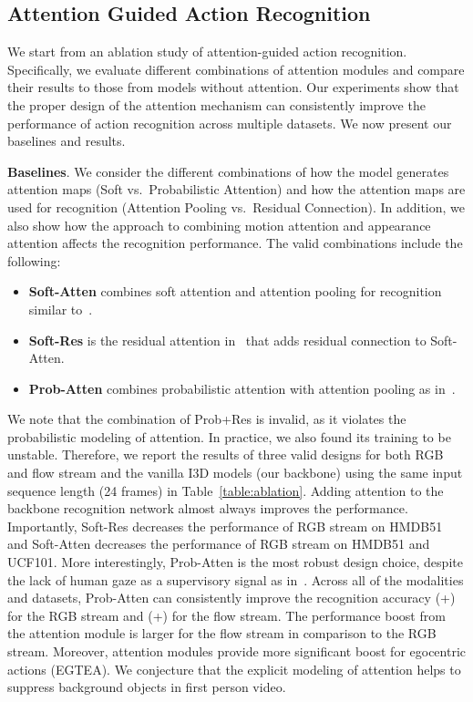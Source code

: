 \documentclass{bmvc2k}
\begin{document}
\subsection{Attention Guided Action Recognition}
We start from an ablation study of attention-guided action recognition. Specifically, we evaluate different combinations of attention modules and compare their results to those from models without attention. Our experiments show that the proper design of the attention mechanism can consistently improve the performance of action recognition across multiple datasets. We now present our baselines and results. 

\noindent \textbf{Baselines}. We consider the different combinations of how the model generates attention maps (Soft vs.\ Probabilistic Attention) and how the attention maps are used for recognition (Attention Pooling vs.\ Residual Connection). In addition, we also show how the approach to combining motion attention and appearance attention affects the recognition performance. The valid combinations include the following:\vspace{-0.5em}
\begin{itemize}[leftmargin=*]
    \item \textbf{Soft-Atten} combines soft attention and attention pooling for recognition similar to~\cite{liu2019end}. \vspace{-0.5em}
    \item \textbf{Soft-Res} is the residual attention in~\cite{wang2017residual} that adds residual connection to Soft-Atten.\vspace{-0.5em}
    \item \textbf{Prob-Atten} combines probabilistic attention with attention pooling as in~\cite{Li_2018_ECCV}.\vspace{-0.5em}
\end{itemize}
We note that the combination of Prob+Res is invalid, as it violates the probabilistic modeling of attention. In practice, we also found its training to be unstable. Therefore, we report the results of three valid designs for both RGB and flow stream and the vanilla I3D models (our backbone) using the same input sequence length (24 frames) in Table~\ref{table:ablation}. Adding attention to the backbone recognition network almost always improves the performance. Importantly, Soft-Res decreases the performance of RGB stream on HMDB51 and Soft-Atten decreases the performance of RGB stream on HMDB51 and UCF101. More interestingly, Prob-Atten is the most robust design choice, despite the lack of human gaze as a supervisory signal as in~\cite{Li_2018_ECCV}. Across all of the modalities and datasets, Prob-Atten can consistently improve the recognition accuracy (+) for the RGB stream and (+) for the flow stream. The performance boost from the attention module is larger for the flow stream in comparison to the RGB stream. Moreover, attention modules provide more significant boost for egocentric actions (EGTEA). We conjecture that the explicit modeling of attention helps to suppress background objects in first person video. 
\end{document}
